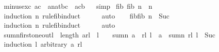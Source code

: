 \begin{isabellebody}
%
\isadelimproof
%
\endisadelimproof
\isanewline
\isanewline
{}\isamarkupfalse%
\ minus{\isacharunderscore}exc{\isacharcolon}\ {\isachardoublequoteopen}a{\isasymge}c\ {\isasymLongrightarrow}\ {\isacharparenleft}a{\isacharcolon}{\isacharcolon}nat{\isacharparenright}{\isacharplus}b{\isacharminus}c\ {\isacharequal}\ a{\isacharminus}c{\isacharplus}b{\isachardoublequoteclose}%
\isadelimproof
\ %
\endisadelimproof
%
\isatagproof
{}\isamarkupfalse%
\ simp%
\endisatagproof
{\isafoldproof}%
%
\isadelimproof
%
\endisadelimproof
\isanewline
\isanewline
{}\isamarkupfalse%
\ fib{}{\isacharunderscore}{}{\isacharcolon}\ {\isachardoublequoteopen}fib{}\ n\ {\isasymge}\ n{\isachardoublequoteclose}\ \isanewline
%
\isadelimproof
\ \ %
\endisadelimproof
%
\isatagproof
{}\isamarkupfalse%
\ {\isacharparenleft}induction\ n\ rule{\isacharcolon}fib{}{\isachardot}induct{\isacharparenright}\isanewline
\ \ \ \ \isamarkupfalse%
\ auto\isanewline
\ \ \isamarkupfalse%
%
\endisatagproof
{\isafoldproof}%
%
\isadelimproof
\isanewline
%
\endisadelimproof
\isanewline
{}\isamarkupfalse%
\ fib{\isacharunderscore}{}{\isacharcolon}{\isachardoublequoteopen}fib\ n\ {\isasymge}\ Suc\ {}{\isachardoublequoteclose}\isanewline
%
\isadelimproof
\ \ %
\endisadelimproof
%
\isatagproof
{}\isamarkupfalse%
\ {\isacharparenleft}induction\ n\ rule{\isacharcolon}fib{\isachardot}induct{\isacharparenright}\isanewline
\ \ \ \ \isamarkupfalse%
\ auto\isanewline
\ \ \isamarkupfalse%
%
\endisatagproof
{\isafoldproof}%
%
\isadelimproof
\isanewline
%
\endisadelimproof
\isanewline
{}\isamarkupfalse%
\ sumn{\isacharunderscore}first{\isacharunderscore}one{\isacharunderscore}out{\isacharcolon}{\isachardoublequoteopen}l\ {\isasymle}\ length\ {\isacharparenleft}a{\isacharhash}rl{\isacharparenright}\ {\isasymLongrightarrow}\ l\ {\isachargreater}\ {}\ {\isasymLongrightarrow}\ sumn\ {\isacharparenleft}a\ {\isacharhash}\ rl{\isacharparenright}\ l\ {\isacharequal}\ a\ {\isacharplus}\ sumn\ rl\ {\isacharparenleft}l\ {\isacharminus}\ Suc\ {}{\isacharparenright}{\isachardoublequoteclose}\isanewline
%
\isadelimproof
%
\endisadelimproof
%
\isatagproof
{}\isamarkupfalse%
\ {\isacharparenleft}induction\ l\ arbitrary{\isacharcolon}\ a\ rl{\isacharparenright}\isanewline
\ \ \isamarkupfalse%
\ {}\isanewline
\ \ \isamarkupfalse%

\end{isabellebody}
